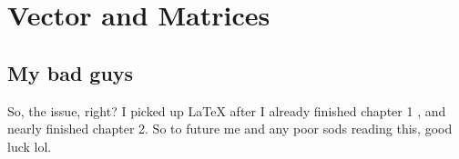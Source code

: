 \chapter{Vector and Matrices}
\section{My bad guys}
So, the issue, right? I picked up LaTeX after I already finished chapter 1
, and nearly finished chapter 2. So to future me and any poor sods
reading this, good luck lol.

